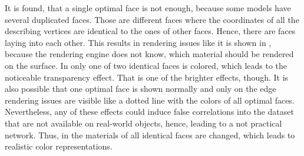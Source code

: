 It is found, that a single optimal face is not enough, because some models have several duplicated faces.
Those are different faces where the coordinates of all the describing vertices are identical to the ones of other faces.
Hence, there are faces laying into each other.
This results in rendering issues like it is shown in , because the rendering engine does not know, which material should be rendered on the surface.
In  only one of two identical faces is colored, which leads to the noticeable transparency effect.
That is one of the brighter effects, though.
It is also possible that one optimal face is shown normally and only on the edge rendering issues are visible like a dotted line with the colors of all optimal faces. 
Nevertheless, any of these effects could induce false correlations into the dataset that are not available on real-world objects, hence, leading to a not practical network.
Thus, in  the materials of all identical faces are changed, which leads to realistic color representations.
